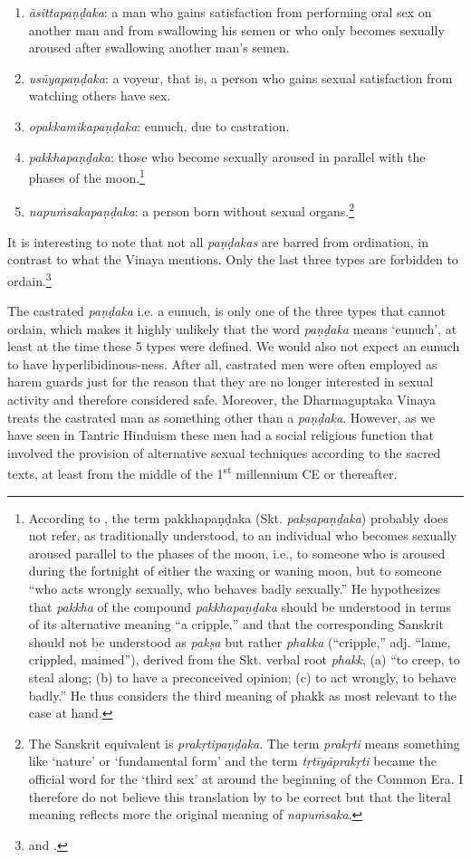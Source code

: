 \begin{enumerate}
\item {\em āsittapaṇḍaka}: a man who gains satisfaction from performing oral sex on another man and from swallowing his semen or who only becomes sexually aroused after swallowing another man’s semen. 
\item {\em usūyapaṇḍaka}: a voyeur, that is, a person who gains sexual satisfaction from watching others have sex. 
\item {\em opakkamikapaṇḍaka}: eunuch, due to castration.
\item {\em pakkhapaṇḍaka}: those who become sexually aroused in parallel with the phases of the moon.\footnote{According to \cite{bomhard}, the term pakkhapaṇḍaka (Skt. {\em pakṣapaṇḍaka}) probably does not refer, as traditionally understood, to an individual who becomes sexually aroused parallel to the phases of the moon, i.e., to someone who is aroused during the fortnight of either the waxing or waning moon, but to someone “who acts wrongly sexually, who behaves badly sexually.” He hypothesizes that {\em pakkha} of the compound {\em pakkhapaṇḍaka} should be understood in terms of its alternative meaning “a cripple,” and that the corresponding Sanskrit should not be understood as {\em pakṣa} but rather {\em phakka} (“cripple,” adj. “lame, crippled, maimed”), derived from the Skt. verbal root {\em phakk}, (a) “to creep, to steal along; (b) to have a preconceived opinion; (c) to act wrongly, to behave badly.” He thus considers the third meaning of phakk as most relevant to the case at hand.}
\item {\em napuṁsakapaṇḍaka}: a person born without sexual organs.\footnote{The Sanskrit equivalent is {\em prakṛtipaṇḍaka}. The term {\em prakṛti} means something like `nature' or `fundamental form' and the term {\em tṛtīyāprakṛti} became the official word for the `third sex' at around the beginning of the Common Era. I therefore do not believe this translation by \cite{thanissaro} to be correct but that the literal meaning reflects more the original meaning of {\em napuṁsaka}.} 
\end{enumerate}

It is interesting to note that not all {\em paṇḍakas} are barred from ordination, in contrast to what the Vinaya mentions. Only the last three types are forbidden to ordain.\footnote{\cite{wong} and \cite{thanissaro}.}

The castrated {\em paṇḍaka} i.e. a eunuch, is only one of the three types that cannot ordain, which makes it highly unlikely that the word {\em paṇḍaka} means `eunuch', at least at the time these 5 types were defined. We would also not expect an eunuch to have hyperlibidinous-ness. After all, castrated men were often employed as harem guards just for the reason that they are no longer interested in sexual activity and therefore considered safe. Moreover, the Dharmaguptaka Vinaya treats the castrated man as something other than a {\em paṇḍaka}. However, as we have seen in Tantric Hinduism these men had a social religious function that involved the provision of alternative sexual techniques according to the sacred texts, at least from the middle of the 1\textsuperscript{st} millennium CE or thereafter.

